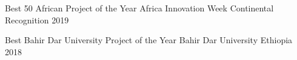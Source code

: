 
\begin{cvhonors}

  \cvhonor
    {Best 50 African Project of the Year} %
    {Africa Innovation Week} %
    {Continental Recognition} %
    {2019} %

  \cvhonor
    {Best Bahir Dar University Project of the Year} %
    {Bahir Dar University} %
    {Ethiopia} %
    {2018} %

\end{cvhonors}